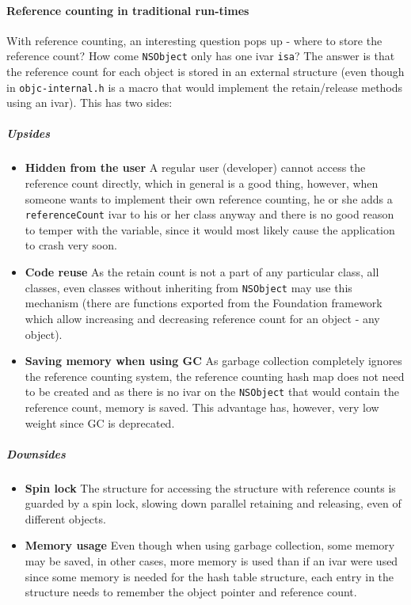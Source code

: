 \paragraph{Reference counting in traditional run-times} With reference counting, an interesting question pops up - where to store the reference count? How come \verb=NSObject= only has one ivar \verb=isa=? The answer is that the reference count for each object is stored in an external structure (even though in \verb=objc-internal.h= is a macro that would implement the retain/release methods using an ivar). This has two sides:
\subparagraph{Upsides}
\begin{itemize}
  \item{\bf{Hidden from the user}} A regular user (developer) cannot access the reference count directly, which in general is a good thing, however, when someone wants to implement their own reference counting, he or she adds a \verb=referenceCount= ivar to his or her class anyway and there is no good reason to temper with the variable, since it would most likely cause the application to crash very soon.
  \item{\bf{Code reuse}} As the retain count is not a part of any particular class, all classes, even classes without inheriting from \verb=NSObject= may use this mechanism (there are functions exported from the Foundation framework which allow increasing and decreasing reference count for an object - any object).
  \item{\bf{Saving memory when using GC}} As garbage collection completely ignores the reference counting system, the reference counting hash map does not need to be created and as there is no ivar on the \verb=NSObject= that would contain the reference count, memory is saved. This advantage has, however, very low weight since GC is deprecated.
\end{itemize}
\subparagraph{Downsides}
\begin{itemize}
  \item{\bf{Spin lock}} The structure for accessing the structure with reference counts is guarded by a spin lock, slowing down parallel retaining and releasing, even of different objects.
  \item{\bf{Memory usage}} Even though when using garbage collection, some memory may be saved, in other cases, more memory is used than if an ivar were used since some memory is needed for the hash table structure, each entry in the structure needs to remember the object pointer and reference count.
\end{itemize}
